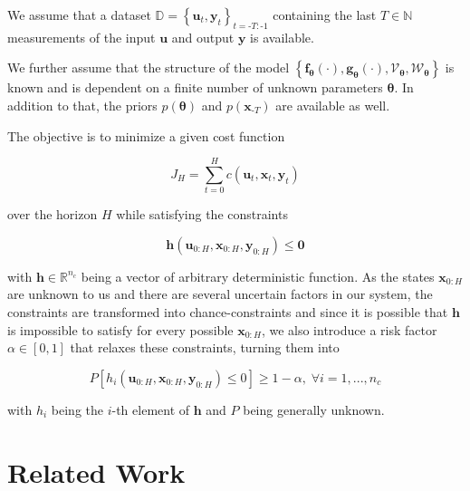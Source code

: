 We assume that a dataset $\mathbb{D} = \left\{\boldsymbol{u}_{t}, \boldsymbol{y}_{t}\right\}_{t = \text{-}T:\text{-}1}$ containing the last $T \in \mathbb{N}$ measurements of the input $\boldsymbol{u}$ and output $\boldsymbol{y}$ is available.

We further assume that the structure of the model $\left\{\boldsymbol{f}_{\boldsymbol{\theta}}(\cdot), \boldsymbol{g}_{\boldsymbol{\theta}}(\cdot), \boldsymbol{\mathcal{V}}_{\boldsymbol{\theta}}, \boldsymbol{\mathcal{W}}_{\boldsymbol{\theta}}\right\}$ is known and is dependent on a finite number of unknown parameters $\boldsymbol{\theta}$. In addition to that, the priors $p(\boldsymbol{\theta})$ and $p(\boldsymbol{x}_{\text{-}T})$ are available as well.

The objective is to minimize a given cost function 

\begin{equation} \label{cost function}
J_H = \sum_{t = 0}^H c(\boldsymbol{u}_t,  \boldsymbol{x}_t,  \boldsymbol{y}_t)
\end{equation}

over the horizon $H$ while satisfying the constraints 

\begin{equation} \label{constraints}
\boldsymbol{h}(\boldsymbol{u}_{0:H},  \boldsymbol{x}_{0:H},  \boldsymbol{y}_{0:H}) \leq \boldsymbol{0}
\end{equation}

with $\boldsymbol{h} \in \mathbb{R}^{n_c}$ being a vector of arbitrary deterministic function. As the states $\boldsymbol{x}_{0:H}$ are unknown to us and there are several uncertain factors in our system, the constraints are transformed into chance-constraints and since it is possible that $\boldsymbol{h}$ is impossible to satisfy for every possible $\boldsymbol{x}_{0:H}$, we also introduce a risk factor $\alpha \in [0, 1]$ that relaxes these constraints, turning them into

\begin{equation} \label{risk constraints}
P \left[ h_i(\boldsymbol{u}_{0:H},  \boldsymbol{x}_{0:H},  \boldsymbol{y}_{0:H}) \leq 0 \right] \geq 1 - \alpha, \; \forall i = 1,...,n_c
\end{equation}

with $h_i$ being the $i$-th element of $\boldsymbol{h}$ and $P$ being generally unknown.

\section{Related Work} \label{Related Work}

